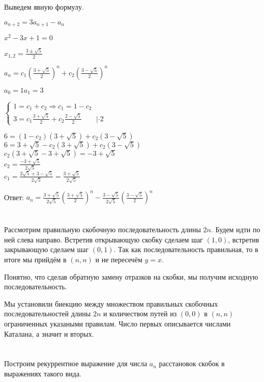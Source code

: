 \documentclass{article}
\begin{document}
Выведем явную формулу.

$a_{n+2}=3a_{n+1}-a_n$

$x^2-3x+1=0$

$x_{1,2}=\frac{3\pm\sqrt{5}}{2}$

$a_n=c_1(\frac{3+\sqrt{5}}{2})^n+c_2(\frac{3-\sqrt{5}}{2})^n$

$a_0=1$\quad$a_1=3$

$
\begin{cases}
    1=c_1+c_2 \Rightarrow c_1=1-c_2\\
    3=c_1\frac{3+\sqrt{5}}{2}+c_2\frac{2-\sqrt{5}}{2} \qquad|\cdot2
\end{cases}
$

$6=(1-c_2)(3+\sqrt{5})+c_2(3-\sqrt{5})$\\
$6=3+\sqrt{5}-c_2(3+\sqrt{5})+c_2(3-\sqrt{5})$\\
$c_2(3+\sqrt{5}-3+\sqrt{5})=-3+\sqrt{5}$\\
$c_2=\frac{-3+\sqrt{5}}{2\sqrt{5}}$\\
$c_1=\frac{2\sqrt{5}+3-\sqrt{5}}{2\sqrt{5}}=\frac{3+\sqrt{5}}{2\sqrt{5}}$

Ответ: $a_n=\frac{3+\sqrt{5}}{2\sqrt{5}}(\frac{3+\sqrt{5}}{2})^n-\frac{3-\sqrt{5}}{2\sqrt{5}}(\frac{3-\sqrt{5}}{2})^n$

\section{}

Рассмотрим правильную скобочную последовательность длины $2n$. Будем идти по
ней слева направо. Встретив открывающую скобку сделаем шаг $(1,0)$, встретив
закрывающую сделаем шаг $(0,1)$. Так как последовательность правильная, то в
итоге мы прийдём в $(n,n)$ и не пересечём $y=x$.

Понятно, что сделав обратную замену отразков на скобки, мы получим исходную
последовательность.

Мы установили биекцию между множеством правильных скобочных последовательностей
длины $2n$ и количеством путей из $(0,0)$ в $(n,n)$ ограниченных указаными
правилам. Число первых описывается числами Каталана, а значит и вторых.

\section{}

Построим рекуррентное выражение для числа $a_n$ расстановок скобок в выражениях
такого вида.
\end{document}
